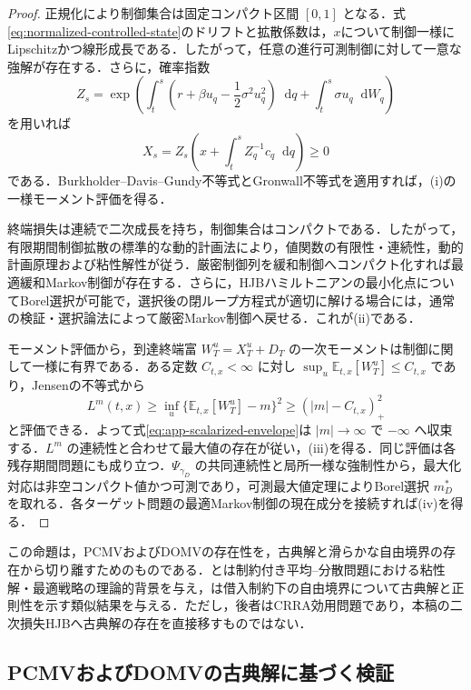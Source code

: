 \documentclass[10pt,a4paper]{article}
\theoremstyle{plain}
\theoremstyle{definition}
\newcommand{\E}{\mathbb{E}}
\newcommand{\dd}{\mathop{}\!\mathrm{d}}
\begin{document}
\begin{proof}
正規化により制御集合は固定コンパクト区間 $[0,1]$ となる．式\eqref{eq:normalized-controlled-state}のドリフトと拡散係数は，$x$について制御一様にLipschitzかつ線形成長である．したがって，任意の進行可測制御に対して一意な強解が存在する．さらに，確率指数
\[
 Z_s=\exp\!\left(
  \int_t^s\!\left(r+\beta u_q-\frac12\sigma^2u_q^2\right)\dd q
  +\int_t^s\!\sigma u_q\dd W_q
 \right)
\]
を用いれば
\begin{equation}
 X_s=Z_s\left(x+\int_t^s Z_q^{-1}c_q\dd q\right)\geq0
 \label{eq:app-state-explicit}
\end{equation}
である．Burkholder--Davis--Gundy不等式とGronwall不等式を適用すれば，(i)の一様モーメント評価を得る．

終端損失は連続で二次成長を持ち，制御集合はコンパクトである．したがって，有限期間制御拡散の標準的な動的計画法により，値関数の有限性・連続性，動的計画原理および粘性解性が従う\citep{FlemingSoner2006}．厳密制御列を緩和制御へコンパクト化すれば最適緩和Markov制御が存在する．さらに，HJBハミルトニアンの最小化点についてBorel選択が可能で，選択後の閉ループ方程式が適切に解ける場合には，通常の検証・選択論法によって厳密Markov制御へ戻せる．これが(ii)である．

モーメント評価から，到達終端富 $W_T^u=X_T^u+D_T$ の一次モーメントは制御に関して一様に有界である．ある定数 $C_{t,x}<\infty$ に対し $\sup_u\E_{t,x}[W_T^u]\leq C_{t,x}$ であり，Jensenの不等式から
\[
 L^m(t,x)
 \geq \inf_u\{\E_{t,x}[W_T^u]-m\}^2
 \geq (|m|-C_{t,x})_+^2
\]
と評価できる．よって式\eqref{eq:app-scalarized-envelope}は $|m|\to\infty$ で $-\infty$ へ収束する．$L^m$ の連続性と合わせて最大値の存在が従い，(iii)を得る．同じ評価は各残存期間問題にも成り立つ．$\Psi_{\gamma_D}$ の共同連続性と局所一様な強制性から，最大化対応は非空コンパクト値かつ可測であり，可測最大値定理によりBorel選択 $m_D^*$ を取れる．各ターゲット問題の最適Markov制御の現在成分を接続すれば(iv)を得る．
\end{proof}

この命題は，PCMVおよびDOMVの存在性を，古典解と滑らかな自由境界の存在から切り離すためのものである．\citet{LiZhouLim2002}と\citet{LiXu2015}は制約付き平均--分散問題における粘性解・最適戦略の理論的背景を与え，\citet{GuanLiZhouZhou2022}は借入制約下の自由境界について古典解と正則性を示す類似結果を与える．ただし，後者はCRRA効用問題であり，本稿の二次損失HJBへ古典解の存在を直接移すものではない．

\subsection{PCMVおよびDOMVの古典解に基づく検証}
\label{app:pcmv-proof}
\end{document}

